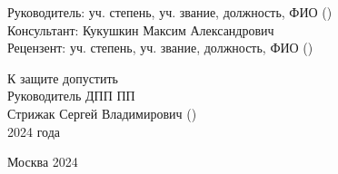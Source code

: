     {\fontsize{12}{12}\selectfont\noindent Руководитель: \hfill уч. степень, уч. звание, должность, ФИО (\underline{\hspace{4cm}})} \\
    {\fontsize{12}{12}\selectfont\noindent Консультант: \hfill Кукушкин Максим Александрович} \\
    {\fontsize{12}{12}\selectfont\noindent Рецензент: \hfill уч. степень, уч. звание, должность, ФИО (\underline{\hspace{4cm}})} \\

    \vspace{20pt}

    {\fontsize{12}{12}\selectfont\noindent
        К защите допустить \\
        Руководитель ДПП ПП \\
        Стрижак Сергей Владимирович \hfill (\underline{\hspace{3cm}}) \\
        \underline{\hspace{1cm}} \underline{\hspace{2cm}} 2024 года}

\vfill

\begin{center}
    Москва 2024
\end{center}